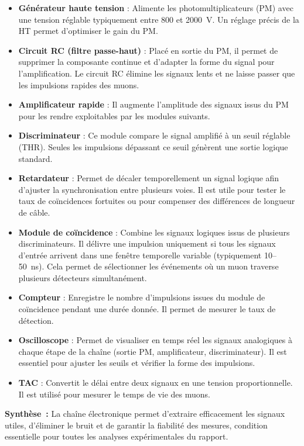 \documentclass[a4paper,12pt,twoside]{article}
\begin{document}
\begin{itemize}
  \item \textbf{Générateur haute tension} : Alimente les photomultiplicateurs (PM) avec une tension réglable typiquement entre 800 et 2000~V. Un réglage précis de la HT permet d’optimiser le gain du PM.
  \item \textbf{Circuit RC (filtre passe-haut)} : Placé en sortie du PM, il permet de supprimer la composante continue et d’adapter la forme du signal pour l’amplification. Le circuit RC élimine les signaux lents et ne laisse passer que les impulsions rapides des muons.
  \item \textbf{Amplificateur rapide} : Il augmente l’amplitude des signaux issus du PM pour les rendre exploitables par les modules suivants.
  \item \textbf{Discriminateur} : Ce module compare le signal amplifié à un seuil réglable (THR). Seules les impulsions dépassant ce seuil génèrent une sortie logique standard.
  \item \textbf{Retardateur} : Permet de décaler temporellement un signal logique afin d’ajuster la synchronisation entre plusieurs voies. Il est utile pour tester le taux de coïncidences fortuites ou pour compenser des différences de longueur de câble.
  \item \textbf{Module de coïncidence} : Combine les signaux logiques issus de plusieurs discriminateurs. Il délivre une impulsion uniquement si tous les signaux d’entrée arrivent dans une fenêtre temporelle variable (typiquement 10–50~ns). Cela permet de sélectionner les événements où un muon traverse plusieurs détecteurs simultanément.
  \item \textbf{Compteur} : Enregistre le nombre d’impulsions issues du module de coïncidence pendant une durée donnée. Il permet de mesurer le taux de détection.
  \item \textbf{Oscilloscope} : Permet de visualiser en temps réel les signaux analogiques à chaque étape de la chaîne (sortie PM, amplificateur, discriminateur). Il est essentiel pour ajuster les seuils et vérifier la forme des impulsions.
  \item \textbf{TAC} : Convertit le délai entre deux signaux en une tension proportionnelle. Il est utilisé pour mesurer le temps de vie des muons.
\end{itemize}

\begin{remarque}
\textbf{Synthèse~:} La chaîne électronique permet d’extraire efficacement les signaux utiles, d’éliminer le bruit et de garantir la fiabilité des mesures, condition essentielle pour toutes les analyses expérimentales du rapport.
\end{remarque}
\end{document}
